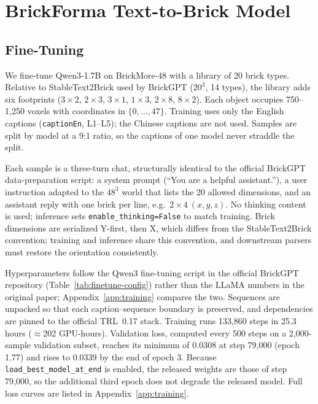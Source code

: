 \documentclass[letterpaper]{article} %
\begin{document}
\section{BrickForma Text-to-Brick Model}
\label{sec:model}
\subsection{Fine-Tuning}
\label{sec:training}
We fine-tune Qwen3-1.7B on BrickMore-48 with a library of 20 brick types. Relative to StableText2Brick used by BrickGPT ($20^3$, 14 types), the library adds six footprints ($3{\times}2$, $2{\times}3$, $3{\times}1$, $1{\times}3$, $2{\times}8$, $8{\times}2$). Each object occupies 750--1,250 voxels with coordinates in $\{0,\ldots,47\}$. Training uses only the English captions (\texttt{captionEn}, L1--L5); the Chinese captions are not used. Samples are split by model at a 9:1 ratio, so the captions of one model never straddle the split.

Each sample is a three-turn chat, structurally identical to the official BrickGPT data-preparation script: a system prompt (``You are a helpful assistant.''), a user instruction adapted to the $48^3$ world that lists the 20 allowed dimensions, and an assistant reply with one brick per line, e.g.\ $2{\times}4\ (x,y,z)$. No thinking content is used; inference sets \texttt{enable\_thinking=False} to match training. Brick dimensions are serialized Y-first, then X, which differs from the StableText2Brick convention; training and inference share this convention, and downstream parsers must restore the orientation consistently.

Hyperparameters follow the Qwen3 fine-tuning script in the official BrickGPT repository (Table~\ref{tab:finetune-config}) rather than the LLaMA numbers in the original paper; Appendix~\ref{app:training} compares the two. Sequences are unpacked so that each caption--sequence boundary is preserved, and dependencies are pinned to the official TRL~0.17 stack. Training runs 133,860 steps in 25.3 hours ($\approx$202 GPU-hours). Validation loss, computed every 500 steps on a 2,000-sample validation subset, reaches its minimum of 0.0308 at step 79,000 (epoch 1.77) and rises to 0.0339 by the end of epoch 3. Because \texttt{load\_best\_model\_at\_end} is enabled, the released weights are those of step 79,000, so the additional third epoch does not degrade the released model. Full loss curves are listed in Appendix~\ref{app:training}.
\end{document}

